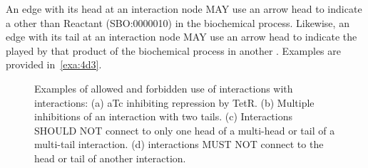 \begin{enumerate}
{\item An edge with its head at an interaction node MAY use an  arrow head to indicate a  other than Reactant (SBO:0000010) in the biochemical process.
	Likewise, an edge with its tail at an interaction node MAY use an  arrow head to indicate the  played by that product of the biochemical process in another .
	Examples are provided in~\ref{exa:4d3}.

	\begin{figure}[h!]
	\centering
	\hspace{1.0cm}
	\hspace{1.0cm}
	\caption{Examples of allowed and forbidden use of interactions with interactions: 
	(a) aTc inhibiting repression by TetR.
	(b) Multiple inhibitions of an interaction with two tails.
	(c) Interactions SHOULD NOT connect to only one head of a multi-head or tail of a multi-tail interaction.
	(d) interactions MUST NOT connect to the head or tail of another interaction.}
	\label{exa:4e}
	\end{figure}

}
\end{enumerate}
